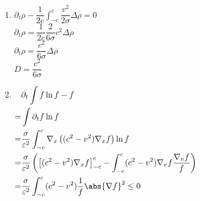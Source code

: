 \documentclass[12pt,a4paper]{article}
\begin{document}
\begin{sol}
\begin{enumerate}
\begin{minipage}[t]{18cm}
			Ainsi : $v\cdot\nabla_x\rho = \sigma\partial_v\left((c^2-v^2)\partial_vh_1\right)$\\
			Donc : $\dfrac{v^2}2\nabla_x \rho + cste = \sigma(c^2-v^2)\partial_v h_1$\\
			D'où l'on tire : $\partial_v h_1 = \dfrac{cste}{\sigma(c^2-v^2)} + \dfrac12\nabla_x\rho\dfrac{v^2-c^2+c^2}{c^2-v^2} = \dfrac{cste + \dfrac12 c^2\nabla_x \rho}{\sigma(c^2-v^2)}-\dfrac12\dfrac{\nabla_x\rho}\sigma$\\
			Pour que $h_1$ soit continue il faut que : $cste + \dfrac12c^2\nabla_x\rho = 0$\\
			Ainsi $h_1 = -\dfrac12v\dfrac{\nabla_x \rho}\sigma + \rouge{cste}$.\\
			$f = \rho + \varepsilon h_1 + o(\varepsilon)$.\\
			$\rho = \dfrac1{2c}\displaystyle\int_{-c}^c f = \rho + \varepsilon\dfrac1{2c}\int_{-c}^ch_1\mathrm dv + o(\varepsilon)$\\
			$\dfrac1{2c}\displaystyle\int_{-c}^c h_1\mathrm dv = 0$ donc $\rouge{cste} = 0$.\\
			Finalement : $h_1 = -\dfrac{v\cdot\nabla_x\rho}{2\sigma}$
		\end{minipage}
		
		\item \begin{minipage}[t]{18cm}
			$\partial_t \rho - \dfrac1{2c}\displaystyle\int_{-c}^c \dfrac{v^2}{2\sigma}\Delta \rho = 0$\\
			$\partial_t \rho = \dfrac1{2c}\dfrac2{6\sigma}c^2\Delta \rho$\\
			$\partial_t\rho = \dfrac{c^2}{6\sigma}\Delta \rho$\\
			$D = \dfrac{c^2}{6\sigma}$
		\end{minipage}
		
		\item \begin{minipage}[t]{18cm}
			$\begin{aligned}[t]
				&\partial_t\displaystyle\int f\ln f - f \\
				=& \int \partial_t f \ln f \\
				=&\dfrac{\sigma}{\varepsilon^2}\int_{-c}^c\nabla_x\left((c^2-v^2)\nabla_x f\right)\ln f \\
				=&\dfrac\sigma{\varepsilon^2}\left(\left[(c^2-v^2)\nabla_x f\right]_{-c}^c - \int_{-c}^c (c^2-v^2)\nabla_v f\dfrac{\nabla_v f}f\right)\\
				=&\dfrac\sigma{\varepsilon^2}\int_{-c}^c(c^2-v^2)\dfrac1f\abs{\nabla f}^2 \leq 0
			\end{aligned}$
		\end{minipage}
		\end{enumerate}
		
		\vspace*{-.5cm}
		
	\end{sol}
	
\end{document}
